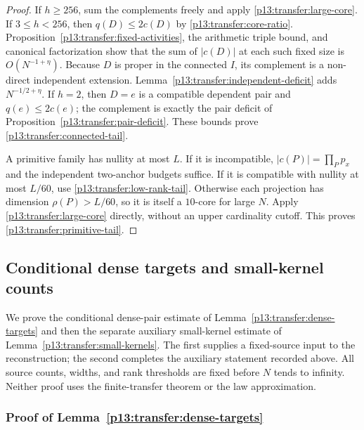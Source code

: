 \begin{proof}
If $h\geq256$, sum the complements freely and apply
\eqref{p13:transfer:large-core}. If $3\leq h<256$, then
$q(D)\leq2c(D)$ by \eqref{p13:transfer:core-ratio}.
Proposition~\ref{p13:transfer:fixed-activities}, the arithmetic triple
bound, and canonical factorization show that the sum of $|c(D)|$ at
each such fixed size is $O(N^{-1+\eta})$. Because $D$ is proper in
the connected $I$, its complement is a non-direct independent extension.
Lemma~\ref{p13:transfer:independent-deficit} adds $N^{-1/2+\eta}$.
If $h=2$, then $D=e$ is a compatible dependent pair and $q(e)\leq2c(e)$;
the complement is exactly the pair deficit of
Proposition~\ref{p13:transfer:pair-deficit}. These bounds prove
\eqref{p13:transfer:connected-tail}.

A primitive family has nullity at most $L$. If it is incompatible,
$|c(P)|=\prod_Pp_x$ and the independent two-anchor budgets suffice.
If it is compatible with nullity at most $L/60$, use
\eqref{p13:transfer:low-rank-tail}. Otherwise each projection has
dimension $\rho(P)>L/60$, so it is itself a $10$-core for large $N$.
Apply \eqref{p13:transfer:large-core} directly, without an upper
cardinality cutoff. This proves \eqref{p13:transfer:primitive-tail}.
\end{proof}


\subsection{Conditional dense targets and small-kernel counts}
\label{p14:comp:transfer}

We prove the conditional dense-pair estimate of
Lemma~\ref{p13:transfer:dense-targets} and then the separate auxiliary
small-kernel estimate of Lemma~\ref{p13:transfer:small-kernels}.
The first supplies a fixed-source input to the reconstruction;
the second completes the auxiliary statement recorded above.
All source counts, widths, and rank thresholds are fixed before
$N$ tends to infinity. Neither proof uses the finite-transfer theorem
or the law approximation.

\subsubsection{Proof of Lemma~\ref{p13:transfer:dense-targets}}
\label{p14:comp:transfer-dense-targets}

